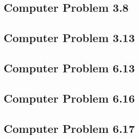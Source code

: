 \documentclass[paper=a4, fontsize=11pt]{scrartcl}
\numberwithin{equation}{section}		%
\numberwithin{figure}{section}			%
\numberwithin{table}{section}				%
\begin{document}
\pagebreak
\subsection{Computer Problem 3.8}


\pagebreak
\subsection{Computer Problem 3.13}


\pagebreak
\subsection{Computer Problem 6.13}


\pagebreak
\subsection{Computer Problem 6.16}


\pagebreak
\subsection{Computer Problem 6.17}












\end{document}
